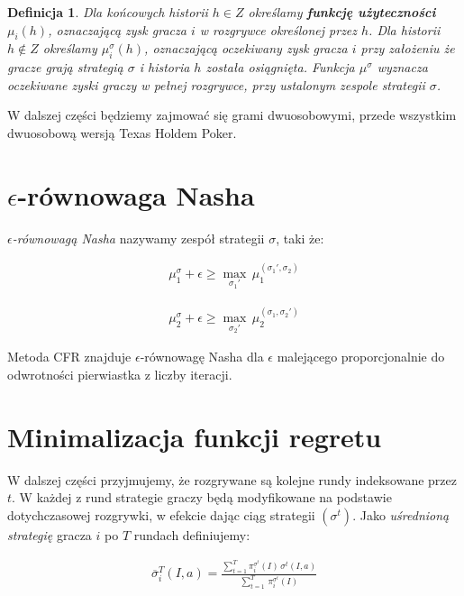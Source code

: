 \documentclass[licencjacka]{pracamgr}
\newtheorem{definition}[theorem]{Definicja}
\begin{document}
\begin{definition}
      Dla końcowych historii $h \in Z$ określamy \textbf{funkcję użyteczności} $\mu_i(h)$, oznaczającą zysk gracza $i$ w rozgrywce
      określonej przez $h$. Dla historii $h \notin Z$ określamy $\mu_i^{\sigma}(h)$, oznaczającą oczekiwany zysk gracza $i$
      przy założeniu że gracze grają strategią $\sigma$ i historia $h$ została osiągnięta. Funkcja $\mu^{\sigma}$ wyznacza
      oczekiwane zyski graczy w pełnej rozgrywce, przy ustalonym zespole strategii $\sigma$.
\end{definition}

\noindent
W dalszej części będziemy zajmować się grami dwuosobowymi, przede wszystkim dwuosobową wersją Texas Holdem Poker.

\section{$\epsilon$-równowaga Nasha}

\emph{$\epsilon$-równowagą Nasha} nazywamy zespół strategii $\sigma$, taki że:

\begin{align*}
\mu_1^{\sigma} + \epsilon \geq  \max_{\sigma_1'} \, \mu_1^{(\sigma_1', \sigma_2)} 
\end{align*}

\begin{align*}
\mu_2^{\sigma} + \epsilon \geq  \max_{\sigma_2'} \, \mu_2^{(\sigma_1, \sigma_2')} 
\end{align*}

\noindent
Metoda CFR znajduje $\epsilon$-równowagę Nasha dla $\epsilon$ malejącego proporcjonalnie do odwrotności pierwiastka z liczby iteracji.

\section{Minimalizacja funkcji regretu}

W dalszej części przyjmujemy, że rozgrywane są kolejne rundy indeksowane przez $t$. W każdej z rund
strategie graczy będą modyfikowane na podstawie dotychczasowej rozgrywki, w efekcie dając ciąg strategii
$(\sigma^t)$. Jako \emph{uśrednioną strategię} gracza $i$ po $T$ rundach definiujemy:

\begin{align*}
\overline{\sigma}_i^T(I, a) = \frac{\sum\limits_{t=1}^T \pi_i^{\sigma^t}(I) \, \sigma^t(I, a)}{\sum\limits_{t=1}^T \, \pi_i^{\sigma^t}(I)}
\end{align*}
\end{document}
